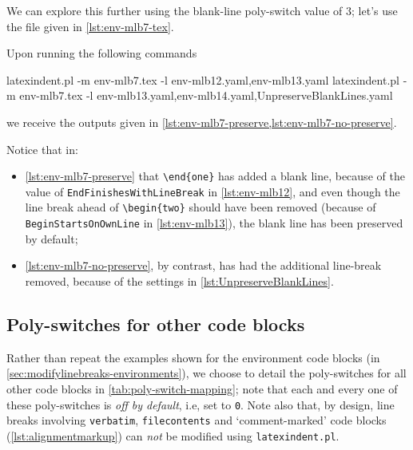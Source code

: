 	We can explore this further using the blank-line poly-switch value of $3$; let's use the file given in \cref{lst:env-mlb7-tex}.


	Upon running the following commands \begin{commandshell}
latexindent.pl -m env-mlb7.tex -l env-mlb12.yaml,env-mlb13.yaml
latexindent.pl -m env-mlb7.tex -l env-mlb13.yaml,env-mlb14.yaml,UnpreserveBlankLines.yaml
            \end{commandshell} we receive the outputs given in \cref{lst:env-mlb7-preserve,lst:env-mlb7-no-preserve}.


	Notice that in: \begin{itemize} \item \cref{lst:env-mlb7-preserve} that \lstinline!\end{one}! has added a blank line, because of the value of \texttt{EndFinishesWithLineBreak} in \vref{lst:env-mlb12}, and even though the line break ahead of \lstinline!\begin{two}! should have been removed (because of \texttt{BeginStartsOnOwnLine} in \vref{lst:env-mlb13}), the blank line has been preserved by default;
		\item \cref{lst:env-mlb7-no-preserve}, by contrast, has had the additional line-break removed, because of the settings in \cref{lst:UnpreserveBlankLines}.
	\end{itemize}

\subsection{Poly-switches for other code blocks}
	Rather than repeat the examples shown for the environment code blocks (in \vref{sec:modifylinebreaks-environments}), we choose to detail the poly-switches for all other code blocks in \cref{tab:poly-switch-mapping}; note that each and every one of these poly-switches is \emph{off by default}, i.e, set to \texttt{0}.
	Note also that, by design, line breaks involving \texttt{verbatim}, \texttt{filecontents} and `comment-marked' code blocks (\vref{lst:alignmentmarkup}) can \emph{not} be modified using \texttt{latexindent.pl}.

